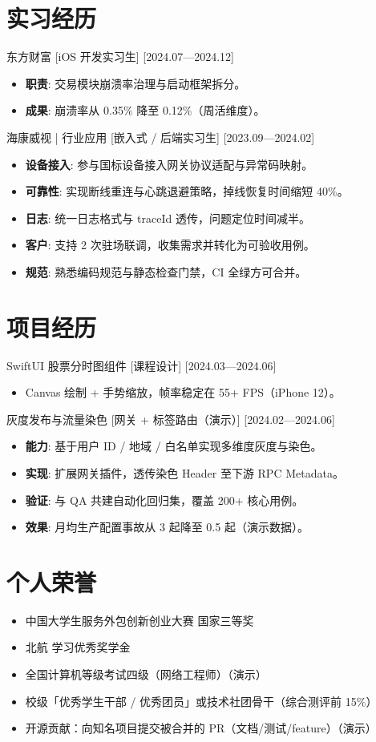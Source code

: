 \documentclass{resume-photo}
\begin{document}
\section{实习经历}
\ResumeItem
{东方财富}
[\textnormal{iOS 开发实习生}]
[2024.07—2024.12]

\begin{itemize}
  \item \textbf{职责}: 交易模块崩溃率治理与启动框架拆分。
  \item \textbf{成果}: 崩溃率从 0.35\% 降至 0.12\%（周活维度）。
\end{itemize}


\ResumeItem
{海康威视 | 行业应用}
[\textnormal{嵌入式 / 后端实习生}]
[2023.09—2024.02]

\begin{itemize}
  \item \textbf{设备接入}: 参与国标设备接入网关协议适配与异常码映射。
  \item \textbf{可靠性}: 实现断线重连与心跳退避策略，掉线恢复时间缩短 40\%。
  \item \textbf{日志}: 统一日志格式与 traceId 透传，问题定位时间减半。
  \item \textbf{客户}: 支持 2 次驻场联调，收集需求并转化为可验收用例。
  \item \textbf{规范}: 熟悉编码规范与静态检查门禁，CI 全绿方可合并。
\end{itemize}



\section{项目经历}
\ResumeItem
{SwiftUI 股票分时图组件}
[\textnormal{课程设计}]
[2024.03—2024.06]

\begin{itemize}
  \item Canvas 绘制 + 手势缩放，帧率稳定在 55+ FPS（iPhone 12）。
\end{itemize}


\ResumeItem
{灰度发布与流量染色}
[\textnormal{网关 + 标签路由（演示）}]
[2024.02—2024.06]

\begin{itemize}
  \item \textbf{能力}: 基于用户 ID / 地域 / 白名单实现多维度灰度与染色。
  \item \textbf{实现}: 扩展网关插件，透传染色 Header 至下游 RPC Metadata。
  \item \textbf{验证}: 与 QA 共建自动化回归集，覆盖 200+ 核心用例。
  \item \textbf{效果}: 月均生产配置事故从 3 起降至 0.5 起（演示数据）。
\end{itemize}



\section{个人荣誉}
\begin{itemize}
  \item 中国大学生服务外包创新创业大赛 国家三等奖
  \item 北航 学习优秀奖学金
  \item 全国计算机等级考试四级（网络工程师）（演示）
  \item 校级「优秀学生干部 / 优秀团员」或技术社团骨干（综合测评前 15\%）
  \item 开源贡献：向知名项目提交被合并的 PR（文档/测试/feature）（演示）
\end{itemize}
\end{document}
